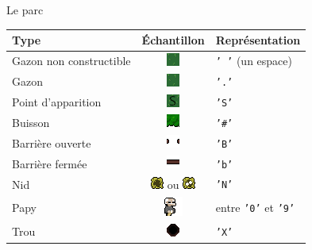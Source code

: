 \documentclass[table]{beamer}
\begin{document}
\begin{frame}{Le parc}
    \begin{center}
    \begin{tabular}{l|c|l}
        \hline
        \textbf{Type} & \textbf{Échantillon} & \textbf{Représentation} \\
        \hline
        Gazon non constructible & \includegraphics[width=.5cm]{img/sprite/grass.png} & \texttt{' '} (un espace) \\
        Gazon & \includegraphics[width=.5cm]{img/sprite/grass.png} & \texttt{'.'} \\
        Point d’apparition & \includegraphics[width=.5cm]{img/sprite/spawn.png} & \texttt{'S'} \\
        Buisson & \includegraphics[width=.5cm]{img/sprite/buisson.png} & \texttt{'\#'} \\
        Barrière ouverte & \includegraphics[width=.5cm]{img/sprite/gate.png} & \texttt{'B'} \\
        Barrière fermée & \includegraphics[width=.5cm]{img/sprite/gate_close.png} & \texttt{'b'} \\
        Nid & \includegraphics[width=.5cm]{img/sprite/nest_empty.png} ou \includegraphics[width=.5cm]{img/sprite/nest_full.png} & \texttt{'N'} \\
        Papy & \includegraphics[width=.5cm]{img/sprite/papy.png} & entre \texttt{'0'} et \texttt{'9'} \\
        Trou & \includegraphics[width=.5cm]{img/sprite/trou.png} & \texttt{'X'} \\
        \hline
    \end{tabular}
    \end{center}
\end{frame}
\end{document}
